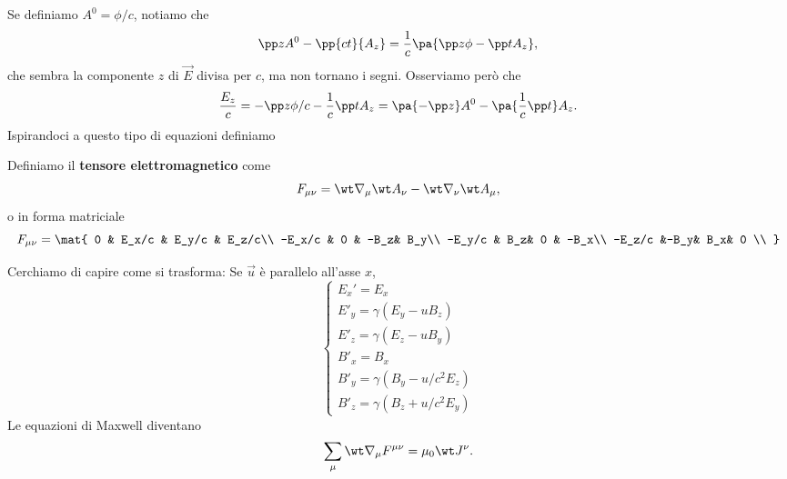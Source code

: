 \noindent
Se definiamo $A^0=\phi/c$, notiamo che
\[\pp z{A^0}-\pp{ct}{A_z}=\frac1c\pa{\pp z\phi-\pp t{A_z}},\]
che sembra la componente $z$ di $\vec E$ divisa per $c$, ma non tornano i segni. Osserviamo per\`o che
\[\frac{E_z}c=-\pp z{\phi/c}-\frac1c\pp t{A_z}=\pa{-\pp z{}}A^0-\pa{\frac1c\pp t{}}A_z.\]
Ispirandoci a questo tipo di equazioni definiamo
\begin{definition}
Definiamo il \textbf{tensore elettromagnetico} come
\[F_{\mu\nu}=\wt \nabla_\mu\wt A_\nu-\wt \nabla_\nu\wt A_{\mu},\]
o in forma matriciale
\[F_{\mu\nu}=\mat{
0 & E_x/c & E_y/c & E_z/c\\
-E_x/c & 0 & -B_z& B_y\\
-E_y/c & B_z& 0  & -B_x\\
-E_z/c &-B_y& B_x& 0  \\
}\]
\end{definition}

\noindent
Cerchiamo di capire come si trasforma: Se $\vec u$ \`e parallelo all'asse $x$,
\[\begin{cases}
E_x'=E_x\\
E'_y=\gamma(E_y-u B_z)\\
E'_z=\gamma(E_z-u B_y)\\
B'_x=B_x\\
B'_y=\gamma(B_y-u/c^2 E_z)\\
B'_z=\gamma(B_z+u/c^2 E_y)
\end{cases}\]
Le equazioni di Maxwell diventano
\[\sum_\mu\wt \nabla_\mu F^{\mu\nu}=\mu_0 \wt J^\nu.\]